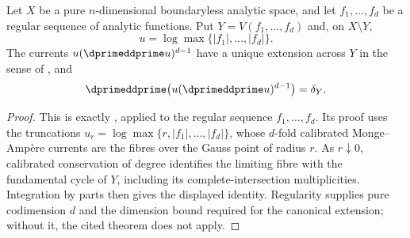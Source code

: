 \begin{theorem}
\label{thm:cld-bochner-martinelli}
Let $X$ be a pure $n$-dimensional boundaryless analytic space, and let
$f_1,\ldots,f_d$ be a regular sequence of analytic functions.  Put
$Y=V(f_1,\ldots,f_d)$ and, on $X\setminus Y$,
\[
                  u=\log\max\{|f_1|,\ldots,|f_d|\}.
\]
The currents $u(\dprimeddprime u)^{d-1}$ have a unique extension across $Y$ in
the sense of \cite[\S18.7]{CLD25}, and
\[
             \dprimeddprime\bigl(u(\dprimeddprime u)^{d-1}\bigr)=\delta_Y.
\]
\end{theorem}
\begin{proof}
This is exactly , applied to the
regular sequence $f_1,\ldots,f_d$.  Its proof uses the truncations
$
 u_r=\log\max\{r,|f_1|,\ldots,|f_d|\}
$, whose $d$-fold calibrated Monge--Amp\`ere currents are the fibres over
the Gauss point of radius $r$.  As $r\downarrow0$, calibrated conservation
of degree identifies the limiting fibre with the fundamental cycle of $Y$,
including its complete-intersection multiplicities.  Integration by parts
then gives the displayed identity.  Regularity supplies pure codimension
$d$ and the dimension bound required for the canonical extension; without
it, the cited theorem does not apply.
\end{proof}

